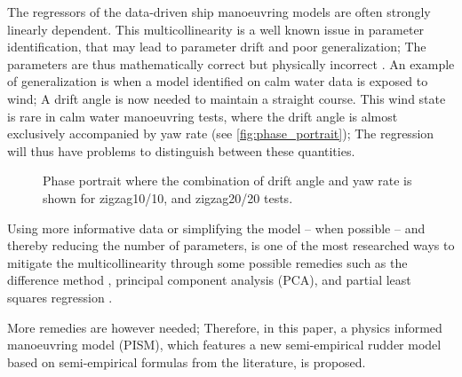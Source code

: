 %
The regressors of the data-driven ship manoeuvring models are often strongly linearly dependent. This multicollinearity is a well known issue in parameter identification, that may lead to parameter drift and poor generalization; The parameters are thus mathematically correct but physically incorrect \citep{luo_parameter_2016}. 
An example of generalization is when a model identified on calm water data is exposed to wind; A drift angle is now needed to maintain a straight course. This wind state is rare in calm water manoeuvring tests, where the drift angle is almost exclusively accompanied by yaw rate (see \autoref{fig:phase_portrait}); 
The regression will thus have problems to distinguish between these quantities.
%
\begin{figure}[h]
  \centering
  
  \caption{Phase portrait where the combination of drift angle and yaw rate is shown for zigzag10/10, and zigzag20/20 tests.}
  \label{fig:phase_portrait}
\end{figure}
Using more informative data or simplifying the model -- when possible -- and thereby reducing the number of parameters, is one of the most researched ways to mitigate the multicollinearity through some possible remedies such as the difference method \citep{luo_parameter_2016}, principal component analysis (PCA), and partial least squares regression \citep{jian-chuan_parametric_2015}. 

More remedies are however needed; Therefore, in this paper, a physics informed manoeuvring model (PISM), which features a new semi-empirical rudder model based on semi-empirical formulas from the literature, is proposed.

